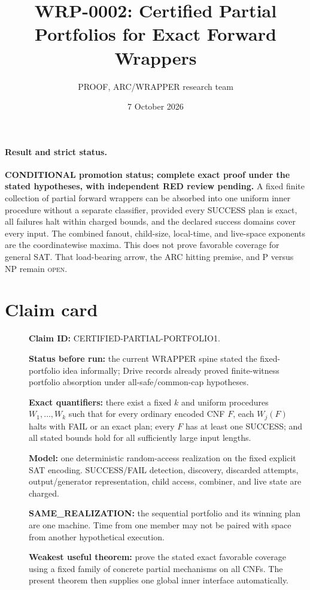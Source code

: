 \documentclass[11pt]{article}
\title{WRP-0002: Certified Partial Portfolios for Exact Forward Wrappers}
\author{PROOF, ARC/WRAPPER research team}
\date{7 October 2026}
\begin{document}
\maketitle

\paragraph{Result and strict status.}
\textbf{CONDITIONAL promotion status; complete exact proof under the stated
hypotheses, with independent RED review pending.}
A fixed finite collection of partial forward wrappers can be absorbed into one
uniform inner procedure without a separate classifier, provided every
SUCCESS plan is exact, all failures halt within charged bounds, and the
declared success domains cover every input.  The combined fanout, child-size,
local-time, and live-space exponents are the coordinatewise maxima.  This
does not prove favorable coverage for general SAT.  That load-bearing arrow,
the ARC hitting premise, and P versus NP remain \textsc{open}.

\section*{Claim card}
\begin{description}
\item[] \textbf{Claim ID:} CERTIFIED-PARTIAL-PORTFOLIO1.
\item[] \textbf{Status before run:} the current WRAPPER spine stated the
fixed-portfolio idea informally; Drive records already proved finite-witness
portfolio absorption under all-safe/common-cap hypotheses.
\item[] \textbf{Exact quantifiers:} there exist a fixed $k$ and uniform
procedures $W_1,\ldots,W_k$ such that for every ordinary encoded CNF $F$, each
$W_j(F)$ halts with FAIL or an exact plan; every $F$ has at least one SUCCESS;
and all stated bounds hold for all sufficiently large input lengths.
\item[] \textbf{Model:} one deterministic random-access realization on the
fixed explicit SAT encoding.  SUCCESS/FAIL detection, discovery, discarded
attempts, output/generator representation, child access, combiner, and live
state are charged.
\item[] \textbf{SAME\_REALIZATION:} the sequential portfolio and its winning
plan are one machine.  Time from one member may not be paired with space from
another hypothetical execution.
\item[] \textbf{Weakest useful theorem:} prove the stated exact favorable
coverage using a fixed family of concrete partial mechanisms on all CNFs.
The present theorem then supplies one global inner interface automatically.
\end{description}
\end{document}
